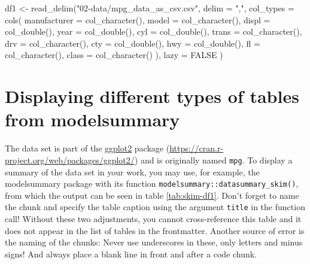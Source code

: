 \documentclass[
  11pt,
  a4paper,
  twoside]{scrbook}
\newenvironment{Shaded}{\begin{snugshade}}{\end{snugshade}}
\newcommand{\AttributeTok}[1]{\textcolor[rgb]{0.77,0.63,0.00}{#1}}
\newcommand{\ConstantTok}[1]{\textcolor[rgb]{0.00,0.00,0.00}{#1}}
\newcommand{\FunctionTok}[1]{\textcolor[rgb]{0.00,0.00,0.00}{#1}}
\newcommand{\NormalTok}[1]{#1}
\newcommand{\OtherTok}[1]{\textcolor[rgb]{0.56,0.35,0.01}{#1}}
\newcommand{\StringTok}[1]{\textcolor[rgb]{0.31,0.60,0.02}{#1}}
\begin{document}
\linespread{1}

\begin{Shaded}
\begin{Highlighting}[]

\NormalTok{df1 }\OtherTok{\textless{}{-}} \FunctionTok{read\_delim}\NormalTok{(}\StringTok{"02{-}data/mpg\_data\_as\_csv.csv"}\NormalTok{,}
                  \AttributeTok{delim =} \StringTok{","}\NormalTok{,}
                  \AttributeTok{col\_types =} \FunctionTok{cols}\NormalTok{(}
                      \AttributeTok{manufacturer =} \FunctionTok{col\_character}\NormalTok{(),}
                      \AttributeTok{model =} \FunctionTok{col\_character}\NormalTok{(),}
                      \AttributeTok{displ =} \FunctionTok{col\_double}\NormalTok{(),}
                      \AttributeTok{year =} \FunctionTok{col\_double}\NormalTok{(),}
                      \AttributeTok{cyl =} \FunctionTok{col\_double}\NormalTok{(),}
                      \AttributeTok{trans =} \FunctionTok{col\_character}\NormalTok{(),}
                      \AttributeTok{drv =} \FunctionTok{col\_character}\NormalTok{(),}
                      \AttributeTok{cty =} \FunctionTok{col\_double}\NormalTok{(),}
                      \AttributeTok{hwy =} \FunctionTok{col\_double}\NormalTok{(),}
                      \AttributeTok{fl =} \FunctionTok{col\_character}\NormalTok{(),}
                      \AttributeTok{class =} \FunctionTok{col\_character}\NormalTok{()}
\NormalTok{                      ), }\AttributeTok{lazy =} \ConstantTok{FALSE}
\NormalTok{                  )}
\end{Highlighting}
\end{Shaded}

\linespread{1}

\hypertarget{displaying-different-types-of-tables-from-modelsummary}{%
\section{Displaying different types of tables from modelsummary}\label{displaying-different-types-of-tables-from-modelsummary}}

The data set is part of the \href{https://cran.r-project.org/web/packages/ggplot2/}{ggplot2} package (\url{https://cran.r-project.org/web/packages/ggplot2/}) and is originally named \texttt{mpg}. To display a summary of the data set in your work, you may use, for example, the modelsummary package with its function \texttt{modelsummary::datasummary\_skim()}, from which the output can be seen in table \ref{tab:skim-df1}. Don't forget to name the chunk and specify the table caption using the argument \texttt{title} in the function call! Without these two adjustments, you cannot cross-reference this table and it does not appear in the list of tables in the frontmatter. Another source of error is the naming of the chunks: Never use underscores in these, only letters and minus signs! And always place a blank line in front and after a code chunk.
\end{document}
